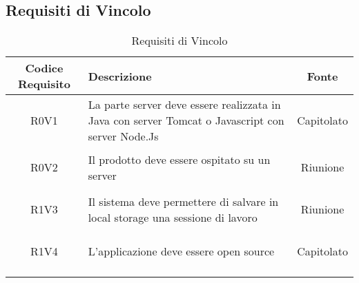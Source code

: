 \documentclass[../AnalisiDeiRequisiti.tex]{subfiles}
\begin{document}
\subsection{Requisiti di Vincolo}
\normalsize
\begin{longtable}{|c|>{\centering}p{7cm}|c|}
	\hline
	\textbf{Codice Requisito} & \textbf{Descrizione} & \textbf{Fonte}\\
	\hline
	\endhead
	\hypertarget{R0V1}{R0V1} & La parte server deve essere realizzata in Java con server Tomcat o Javascript con server Node.Js & Capitolato \\ \hline
	\hypertarget{R0V2}{R0V2} & Il prodotto deve essere ospitato su un server & Riunione \\ \hline
	\hypertarget{R1V3}{R1V3} & Il sistema deve permettere di salvare in local storage una sessione di lavoro & Riunione \\ \hline
	\hypertarget{R1V4}{R1V4} & L'applicazione deve essere open source
	& Capitolato \\ \hline
	\caption[Requisiti di Vincolo]{Requisiti di Vincolo}
	\label{tabella:req3}
\end{longtable}
\clearpage
\end{document}
